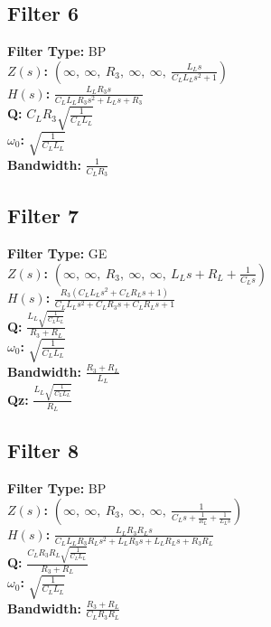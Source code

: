 \documentclass{article}
\begin{document}
\subsection*{Filter 6}
\textbf{Filter Type:} BP \\ 
\textbf{$Z(s)$:} $\left( \infty, \  \infty, \  R_{3}, \  \infty, \  \infty, \  \frac{L_{L} s}{C_{L} L_{L} s^{2} + 1}\right)$ \\ 
\textbf{$H(s)$:} $\frac{L_{L} R_{3} s}{C_{L} L_{L} R_{3} s^{2} + L_{L} s + R_{3}}$ \\ 
\textbf{Q:} $C_{L} R_{3} \sqrt{\frac{1}{C_{L} L_{L}}}$ \\ 
\textbf{$\omega_0$:} $\sqrt{\frac{1}{C_{L} L_{L}}}$ \\ 
\textbf{Bandwidth:} $\frac{1}{C_{L} R_{3}}$ \\ 
\subsection*{Filter 7}
\textbf{Filter Type:} GE \\ 
\textbf{$Z(s)$:} $\left( \infty, \  \infty, \  R_{3}, \  \infty, \  \infty, \  L_{L} s + R_{L} + \frac{1}{C_{L} s}\right)$ \\ 
\textbf{$H(s)$:} $\frac{R_{3} \left(C_{L} L_{L} s^{2} + C_{L} R_{L} s + 1\right)}{C_{L} L_{L} s^{2} + C_{L} R_{3} s + C_{L} R_{L} s + 1}$ \\ 
\textbf{Q:} $\frac{L_{L} \sqrt{\frac{1}{C_{L} L_{L}}}}{R_{3} + R_{L}}$ \\ 
\textbf{$\omega_0$:} $\sqrt{\frac{1}{C_{L} L_{L}}}$ \\ 
\textbf{Bandwidth:} $\frac{R_{3} + R_{L}}{L_{L}}$ \\ 
\textbf{Qz:} $\frac{L_{L} \sqrt{\frac{1}{C_{L} L_{L}}}}{R_{L}}$ \\ 
\subsection*{Filter 8}
\textbf{Filter Type:} BP \\ 
\textbf{$Z(s)$:} $\left( \infty, \  \infty, \  R_{3}, \  \infty, \  \infty, \  \frac{1}{C_{L} s + \frac{1}{R_{L}} + \frac{1}{L_{L} s}}\right)$ \\ 
\textbf{$H(s)$:} $\frac{L_{L} R_{3} R_{L} s}{C_{L} L_{L} R_{3} R_{L} s^{2} + L_{L} R_{3} s + L_{L} R_{L} s + R_{3} R_{L}}$ \\ 
\textbf{Q:} $\frac{C_{L} R_{3} R_{L} \sqrt{\frac{1}{C_{L} L_{L}}}}{R_{3} + R_{L}}$ \\ 
\textbf{$\omega_0$:} $\sqrt{\frac{1}{C_{L} L_{L}}}$ \\ 
\textbf{Bandwidth:} $\frac{R_{3} + R_{L}}{C_{L} R_{3} R_{L}}$ \\ 
\end{document}
